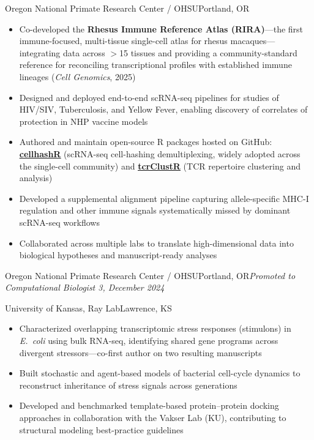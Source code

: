 \documentclass[11pt, a4paper]{moderncv}
\let\oldhref\href
\renewcommand{\href}[2]{\oldhref{#1}{\underline{#2}}}
\begin{document}
%
  {Oregon National Primate Research Center / OHSU}{Portland, OR}{}%
  {\begin{itemize}
    \item Co-developed the \textbf{Rhesus Immune Reference Atlas (RIRA)}---the first immune-focused,
          multi-tissue single-cell atlas for rhesus macaques---integrating data across $>$15 tissues
          and providing a community-standard reference for reconciling transcriptional profiles with
          established immune lineages (\textit{Cell Genomics}, 2025)
    \item Designed and deployed end-to-end scRNA-seq pipelines for studies of HIV/SIV, Tuberculosis,
          and Yellow Fever, enabling discovery of correlates of protection in NHP vaccine models
    \item Authored and maintain open-source R packages hosted on GitHub:
          \textbf{\href{https://github.com/BimberLab/cellhashR}{cellhashR}} (scRNA-seq cell-hashing demultiplexing, widely adopted across the single-cell community) and
          \textbf{\href{https://github.com/GWMcElfresh/tcrClustR}{tcrClustR}} (TCR repertoire clustering and analysis)
    \item Developed a supplemental alignment pipeline capturing allele-specific MHC-I regulation and
          other immune signals systematically missed by dominant scRNA-seq workflows
    \item Collaborated across multiple labs to translate high-dimensional data into biological
          hypotheses and manuscript-ready analyses
  \end{itemize}}

%
  {Oregon National Primate Research Center / OHSU}{Portland, OR}{}{\textit{Promoted to Computational Biologist 3, December 2024}}

%
  {University of Kansas, Ray Lab}{Lawrence, KS}{}%
  {\begin{itemize}
    \item Characterized overlapping transcriptomic stress responses (stimulons) in \textit{E.\ coli}
          using bulk RNA-seq, identifying shared gene programs across divergent stressors---co-first
          author on two resulting manuscripts
    \item Built stochastic and agent-based models of bacterial cell-cycle dynamics to reconstruct
          inheritance of stress signals across generations
    \item Developed and benchmarked template-based protein--protein docking approaches in
          collaboration with the Vakser Lab (KU), contributing to structural modeling best-practice
          guidelines
  \end{itemize}}
\end{document}
